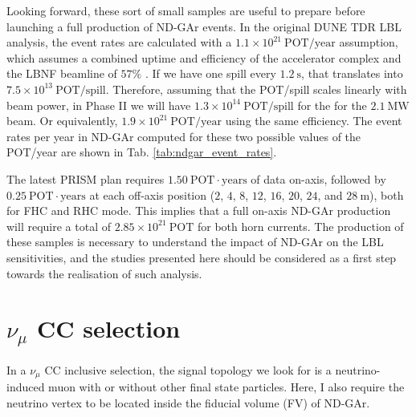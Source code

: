 Looking forward, these sort of small samples are useful to prepare before launching a full production of ND-GAr events. In the original DUNE TDR LBL analysis, the event rates are calculated with a $1.1 \times 10^{21} ~ \mathrm{POT}/\mathrm{year}$ assumption, which assumes a combined uptime and efficiency of the accelerator complex and the LBNF beamline of $57\%$ \cite{DUNE2020}. If we have one spill every $1.2~\mathrm{s}$, that translates into $7.5 \times 10^{13} ~ \mathrm{POT}/\mathrm{spill}$. Therefore, assuming that the POT/spill scales linearly with beam power, in Phase II we will have $1.3 \times 10^{14} ~ \mathrm{POT}/\mathrm{spill}$ for the for the $2.1 ~ \mathrm{MW}$ beam. Or equivalently, $1.9 \times 10^{21} ~ \mathrm{POT}/\mathrm{year}$ using the same efficiency. The event rates per year in ND-GAr computed for these two possible values of the POT/year are shown in Tab. \ref{tab:ndgar_event_rates}.

The latest PRISM plan requires $1.50 ~ \mathrm{POT} \cdot \mathrm{years}$ of data on-axis, followed by $0.25 ~ \mathrm{POT} \cdot \mathrm{years}$ at each off-axis position ($2$, $4$, $8$, $12$, $16$, $20$, $24$, and $28~\mathrm{m}$), both for FHC and RHC mode. This implies that a full on-axis ND-GAr production will require a total of $2.85 \times 10^{21}~\mathrm{POT}$ for both horn currents. The production of these samples is necessary to understand the impact of ND-GAr on the LBL sensitivities, and the studies presented here should be considered as a first step towards the realisation of such analysis.

\section[\texorpdfstring{$\nu_{\mu}$}{numu} CC selection]{\boldmath\texorpdfstring{$\nu_{\mu}$}{numu} CC selection}
\label{sec:gar_numu_cc}

In a $\nu_{\mu}$ CC inclusive selection, the signal topology we look for is a neutrino-induced muon with or without other final state particles. Here, I also require the neutrino vertex to be located inside the fiducial volume (FV) of ND-GAr.

